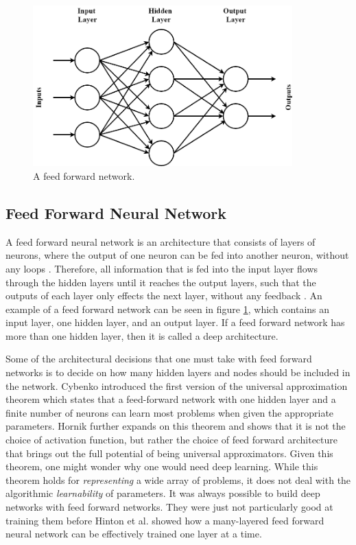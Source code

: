 \documentclass{UoYCSproject}
\begin{document}
\begin{figure}[h]
\includegraphics[width=10cm]{feedforward.png}
\centering
\caption{A feed forward network.} 
\label{fig:feedforward}
\end{figure}

\subsection{Feed Forward Neural Network}
A feed forward neural network is an architecture that consists of layers of neurons, where the output of one neuron can be fed into another neuron, without any loops \cite{jain1996artificial}. Therefore, all information that is fed into the input layer flows through the hidden layers until it reaches the output layers, such that the outputs of each layer only effects the next layer, without any feedback \cite{jhaartificial}. An example of a feed forward network can be seen in figure \ref{fig:feedforward}, which contains an input layer, one hidden layer, and an output layer. If a feed forward network has more than one hidden layer, then it is called a deep architecture. 

Some of the architectural decisions that one must take with feed forward networks is to decide on how many hidden layers and nodes should be included in the network. Cybenko \cite{cybenko1989approximation} introduced the first version of the universal approximation theorem which states that a feed-forward network with one hidden layer and a finite number of neurons can learn most problems when given the appropriate parameters. Hornik \cite{hornik1991approximation} further expands on this theorem and shows that it is not the choice of activation function, but rather the choice of feed forward architecture that brings out the full potential of being universal approximators. Given this theorem, one might wonder why one would need deep learning. While this theorem holds for \textit{representing} a wide array of problems, it does not deal with the algorithmic \textit{learnability} of parameters. It was always possible to build deep networks with feed forward networks. They were just not particularly good at training them before Hinton et al. \cite{hinton2006fast} showed how a many-layered feed forward neural network can be effectively trained one layer at a time. 
\end{document}
